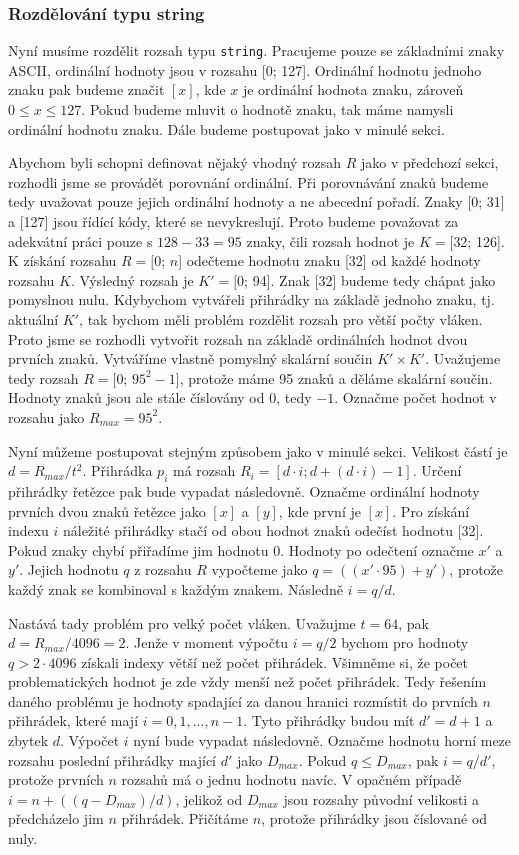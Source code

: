 \subsubsection{Rozdělování typu string}

Nyní musíme rozdělit rozsah typu \texttt{string}.
Pracujeme pouze se základními znaky ASCII, ordinální hodnoty jsou v rozsahu [0; 127].
Ordinální hodnotu jednoho znaku pak budeme značit $[x]$, kde $x$ je ordinální hodnota znaku, zároveň $0\leq x\leq 127$.
Pokud budeme mluvit o hodnotě znaku, tak máme namysli ordinální hodnotu znaku.
Dále budeme postupovat jako v minulé sekci.

Abychom byli schopni definovat nějaký vhodný rozsah $R$ jako v předchozí sekci, rozhodli jsme se provádět porovnání ordinální.
Při porovnávání znaků budeme tedy uvažovat pouze jejich ordinální hodnoty a ne abecední pořadí.
Znaky [0; 31] a [127] jsou řídící kódy, které se nevykreslují.
Proto budeme považovat za adekvátní práci pouze s $128-33=95$ znaky, čili rozsah hodnot je $K=[$32; 126].
K získání rozsahu $R=[$0; $n$] odečteme hodnotu znaku [32] od každé hodnoty rozsahu $K$.
Výsledný rozsah je  $K'=[$0; 94].
Znak [32] budeme tedy chápat jako pomyslnou nulu.
Kdybychom vytvářeli přihrádky na základě jednoho znaku, tj. aktuální $K'$, tak bychom měli problém rozdělit rozsah pro větší počty vláken.
Proto jsme se rozhodli vytvořit rozsah na základě ordinálních hodnot dvou prvních znaků.
Vytváříme vlastně pomyslný skalární součin $K' \times K'$.
Uvažujeme tedy rozsah $R=[$0; $95^2-1]$, protože máme 95 znaků a děláme skalární součin.
Hodnoty znaků jsou ale stále číslovány od 0, tedy $-1$.
Označme počet hodnot v rozsahu jako $R_{max}=95^2$.

Nyní můžeme postupovat stejným způsobem jako v minulé sekci.
Velikost částí je $d=R_{max}/t^2$.
Přihrádka $p_i$ má rozsah $R_i=[d \cdot i; d+(d \cdot i)-1]$.
Určení přihrádky řetězce pak bude vypadat následovně.
Označme ordinální hodnoty prvních dvou znaků řetězce jako $[x]$ a $[y]$, kde první je $[x]$.
Pro získání indexu $i$ náležité přihrádky stačí od obou hodnot znaků odečíst hodnotu [32].
Pokud znaky chybí přiřadíme jim hodnotu 0.  
Hodnoty po odečtení označme $x'$ a $y'$.
Jejich hodnotu $q$ z rozsahu $R$ vypočteme jako $q=((x' \cdot 95)+y')$, protože každý znak se kombinoval s každým znakem.
Následně $i=q/d$.

Nastává tady problém pro velký počet vláken.
Uvažujme $t=64$, pak $d=R_{max}/4096=2$.
Jenže v moment výpočtu $i=q/2$ bychom pro hodnoty $q>2 \cdot 4096$ získali indexy větší než počet přihrádek.  
Všimněme si, že počet problematických hodnot je zde vždy menší než počet přihrádek.
Tedy řešením daného problému je hodnoty spadající za danou hranici rozmístit do prvních $n$ přihrádek, které mají $i=0, 1, ..., n-1$.
Tyto přihrádky budou mít $d'=d+1$ a zbytek $d$.
Výpočet $i$ nyní bude vypadat následovně.
Označme hodnotu horní meze rozsahu poslední přihrádky mající $d'$ jako $D_{max}$.
Pokud $q\leq D_{max}$, pak $i=q/d'$, protože prvních $n$ rozsahů má o jednu hodnotu navíc.
V opačném případě $i=n+((q-D_{max})/d)$, jelikož od $D_{max}$ jsou rozsahy původní velikosti a předcházelo jim $n$ přihrádek.
Přičítáme $n$, protože přihrádky jsou číslované od nuly.

